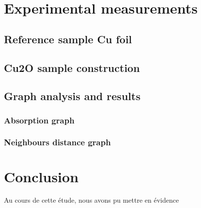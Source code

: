 \documentclass[11pt,a4paper,oneside]{article}
\begin{document}
\newpage



\section{Experimental measurements}
\subsection{Reference sample Cu foil}


\subsection{Cu2O sample construction}


\subsection{Graph analysis and results} \label{results}


\subsubsection{Absorption graph}


\subsubsection{Neighbours distance graph}


\newpage

\section*{Conclusion}

Au cours de cette étude, nous avons pu mettre en évidence


\nocite{*}


\end{document}
